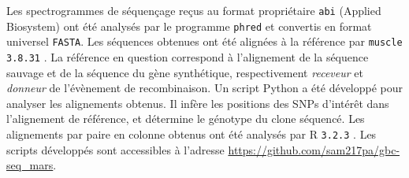 Les spectrogrammes de séquençage reçus au format propriétaire \texttt{abi}
(Applied Biosystem) ont été analysés par le programme \texttt{phred}
\cite{ewing_base-calling_1998} et convertis en format universel \texttt{FASTA}.
Les séquences obtenues ont été alignées à la référence par
\texttt{muscle 3.8.31} \cite{edgar_muscle:_2004}. La référence en question
correspond à l'alignement de la séquence sauvage et de la séquence du gène
synthétique, respectivement \emph{receveur} et \emph{donneur} de l'évènement de
recombinaison. Un script Python \cite{_python_2016} a été développé pour
analyser les alignements obtenus. Il infère les positions des SNPs d'intérêt
dans l'alignement de référence, et détermine le génotype du clone séquencé. Les
alignements par paire en colonne obtenus ont été analysés par \textrm{R}
\texttt{3.2.3} \cite{r_core_team_r:_2015}. Les scripts développés sont
accessibles à l'adresse \url{https://github.com/sam217pa/gbc-seq_mars}.
